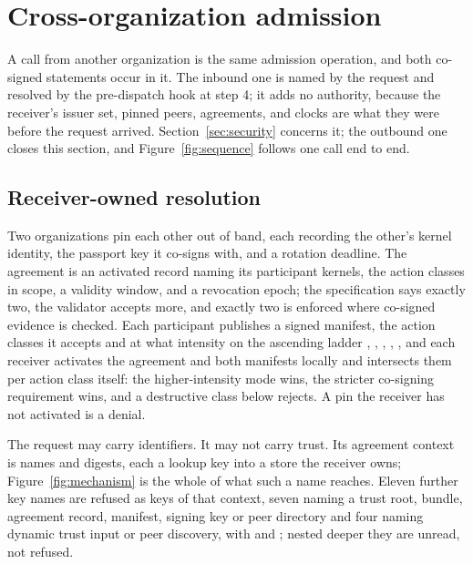 \section{Cross-organization admission}
\label{sec:cross}

A call from another organization is the same admission operation, and both
co-signed statements occur in it. The inbound one is named by the request and
resolved by the pre-dispatch hook at step 4; it adds no authority, because the
receiver's issuer set, pinned peers, agreements, and clocks are what they were
before the request arrived. Section~\ref{sec:security} concerns it; the
outbound one closes this section, and Figure~\ref{fig:sequence} follows one
call end to end.



\subsection{Receiver-owned resolution}

Two organizations pin each other out of band, each recording the other's
kernel identity, the passport key it co-signs with, and a rotation deadline.
The agreement is an activated record naming its participant kernels, the
action classes in scope, a validity window, and a revocation epoch; the
specification says exactly two, the validator accepts more, and exactly two is
enforced where co-signed evidence is checked. Each participant publishes a
signed manifest, the action classes it accepts and at what intensity on the
ascending ladder , ,
, , , and
each receiver activates the agreement and both manifests locally and
intersects them per action class itself: the higher-intensity mode wins, the
stricter co-signing requirement wins, and a destructive class below
 rejects. A pin the receiver has not activated is a
denial.

The request may carry identifiers. It may not carry trust. Its agreement
context is names and digests, each a lookup key into a store the receiver
owns; Figure~\ref{fig:mechanism} is the whole of what such a name reaches.
Eleven further key names are refused as keys of that context, seven naming a
trust root, bundle, agreement record, manifest, signing key or peer directory
and four naming dynamic trust input or peer discovery, with
 and ;
nested deeper they are unread, not refused.


